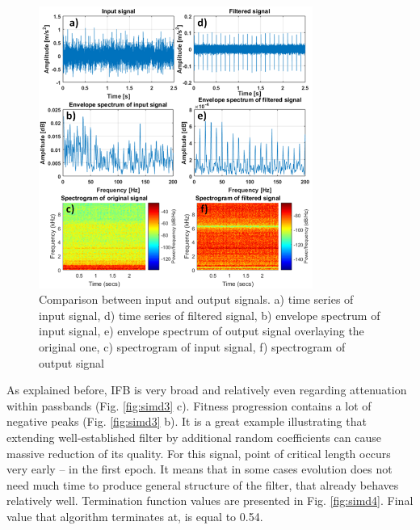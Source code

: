 \documentclass[preprint,12pt]{elsarticle}
\begin{document}
\begin{figure}[ht!]
\centering
\includegraphics[width=0.8\textwidth]{wykresy/simd2.png}
\caption{Comparison between input and output signals. a) time series of input signal, d) time series of filtered signal, b) envelope spectrum of input signal, e) envelope spectrum of output signal overlaying the original one, c) spectrogram of input signal, f) spectrogram of output signal}
\label{fig:simd2}
\end{figure}

As explained before, IFB is very broad and relatively even regarding attenuation within passbands (Fig. \ref{fig:simd3} c). Fitness progression contains a lot of negative peaks (Fig. \ref{fig:simd3} b). It is a great example illustrating that extending well-established filter by additional random coefficients can cause massive reduction of its quality. For this signal, point of critical length occurs very early – in the first epoch. It means that in some cases evolution does not need much time to produce general structure of the filter, that already behaves relatively well. Termination function values are presented in Fig. \ref{fig:simd4}. Final value that algorithm terminates at, is equal to 0.54.
\end{document}
